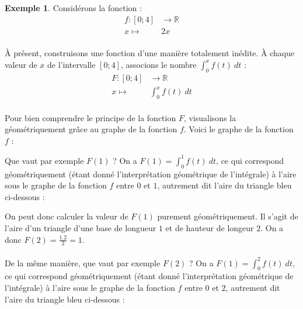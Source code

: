 \documentclass[a4paper,fontsize=13pt]{scrreprt}
\theoremstyle{plain}
\theoremstyle{definition}
\newtheorem{exe}[subsection]{Exemple}
\newcommand{\rr}{\mathbb{R}}
\newcommand {\grille}{\draw[help lines] (\xmin,\ymin) grid (\xmax,\ymax);}
\newcommand {\axes} {
	\draw[thick, ->] (\xmin,0) -- (\xmax+1,0);
	\draw[thick, ->] (0,\ymin) -- (0,\ymax+1);
	\draw (0,\ymax+0.5) node [left] {$y$};
	\draw (\xmax+0.5, 0) node [below] {$x$};
	\draw[thick] (-0.15,1)--(0.15,1) (1,-0.15)--(1,0.15);
	\draw (0,1)node[left]{$1$} (1,0)node[below]{$1$};
}
\begin{document}
\begin{exe}
Considérons la fonction :
~\\
\begin{align*}
f : [0;4] &\to \rr \\
x \mapsto& 2x
\end{align*}
~\\
À présent, construisons une fonction d'une manière totalement inédite. À chaque valeur de $x$ de l'intervalle $[0;4]$, associons le nombre $\int_{0}^{x} f(t)~dt$ :
~\\
\begin{align*}
F : [0;4] &\to \rr \\
x \mapsto& \int_{0}^{x} f(t)~dt
\end{align*}
~\\
Pour bien comprendre le principe de la fonction $F$, visualisons la géométriquement grâce au graphe de la fonction $f$.
\newpage
Voici le graphe de la fonction $f$ :
\begin{center}
\end{center}
Que vaut par exemple $F(1)$ ? On a $F(1) = \int_{0}^{1} f(t)~dt$, ce qui correspond géométriquement (étant donné l'interprétation géométrique de l'intégrale) à l'aire sous le graphe de la fonction $f$ entre $0$ et $1$, autrement dit l'aire du triangle bleu ci-dessous :
\begin{center}
\end{center}
On peut donc calculer la valeur de $F(1)$ purement géométriquement. Il s'agit de l'aire d'un triangle d'une base de longueur $1$ et de hauteur de longeur $2$. On a donc $F(2) = \frac{1.2}{2} = 1$. \\
~\\
De la même manière, que vaut par exemple $F(2)$ ? On a $F(1) = \int_{0}^{2} f(t)~dt$, ce qui correspond géométriquement (étant donné l'interprétation géométrique de l'intégrale) à l'aire sous le graphe de la fonction $f$ entre $0$ et $2$, autrement dit l'aire du triangle bleu ci-dessous :
\begin{center}

\end{center}
\end{exe}
\end{document}
